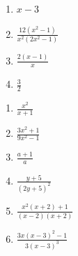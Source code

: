 \begin{respostas}{5}
\begin{multicols}{3}
\begin{enumerate}[label=\alph*)]
            \item $x-3$
            
            \item $\frac{12(x^2-1)}{x^2(2x^2-1)}$
            
            \item $\frac{2(x-1)}{x}$
            
            \item $\frac{3}{2}$
        \end{enumerate}
    \end{multicols}
    
    \ansitem{} \begin{multicols}{3}
        \begin{enumerate}[label=\alph*)]
            \item $\frac{x^2}{x+1}$
            
            \item $\frac{3x^2+1}{9x^2-1}$
            
            \item $\frac{a+1}{a}$
            
            \item $\frac{y+5}{(2y+5)^2}$
            
            \item $\frac{x^2(x+2)+1}{(x-2)(x+2)}$
            
            \item $\frac{3x(x-3)^2-1}{3(x-3)^3} $
        \end{enumerate}
    \end{multicols}
\end{respostas}